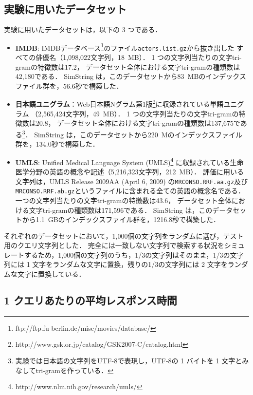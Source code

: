 \documentclass[japanese]{jnlp_JS2.0}
\begin{document}
\subsection{実験に用いたデータセット}

実験に用いたデータセットは，以下の 3 つである．
\begin{itemize}
	\item {\bf IMDB}:
	IMDBデータベース\footnote{ftp://ftp.fu-berlin.de/misc/movies/database/}のファイル\texttt{actors.list.gz}から抜き出した
\pagebreak
	すべての俳優名（1,098,022文字列，18~MB）．
	1 つの文字列当たりの文字tri-gramの特徴数は17.2，
	データセット全体における文字tri-gramの種類数は42,180である．
	SimString
	は，このデータセットから83~MBのインデックスファイル群を，56.6秒で構築した．
	\item {\bf 日本語ユニグラム}：Web日本語Nグラム第1版\footnote{http://www.gsk.or.jp/catalog/GSK2007-C/catalog.html}に収録されている単語ユニグラム\linebreak
	（2,565,424文字列，49~MB）．
	1 つの文字列当たりの文字tri-gramの特徴数は20.8，
	データセット全体における文字tri-gramの種類数は137,675である\footnote{実験では日本語の文字列をUTF-8で表現し，UTF-8の 1 バイトを 1 文字とみなしてtri-gramを作っている．}．
	SimString
は，このデータセットから220~Mのインデックスファイル群を，134.0秒で構築した．
	\item {\bf UMLS}:
	Unified Medical Language System (UMLS)\footnote{http://www.nlm.nih.gov/research/umls/} に収録されている生命医学分野の英語の概念や記述（5,216,323文字列，212~MB）．
	評価に用いる文字列は，UMLS Release 2009AA (April 6, 2009) の\texttt{MRCONSO.RRF.aa.gz}及び\texttt{MRCONSO.RRF.ab.gz}というファイルに含まれる全ての英語の概念名である．
	一つの文字列当たりの文字tri-gramの特徴数は43.6，
	データセット全体における文字tri-gramの種類数は171,596である．
	SimString
	は，このデータセットから1.1~GBのインデックスファイル群を，1216.8秒で構築した．
\end{itemize}

それぞれのデータセットにおいて，1,000個の文字列をランダムに選び，テスト用のクエリ文字列とした．
完全には一致しない文字列で検索する状況をシミュレートするため，1,000個の文字列のうち，1/3の文字列はそのまま，1/3の文字列には 1 文字をランダムな文字に置換，残りの1/3の文字列には 2 文字をランダムな文字に置換している．



\subsection{1 クエリあたりの平均レスポンス時間}
\end{document}
